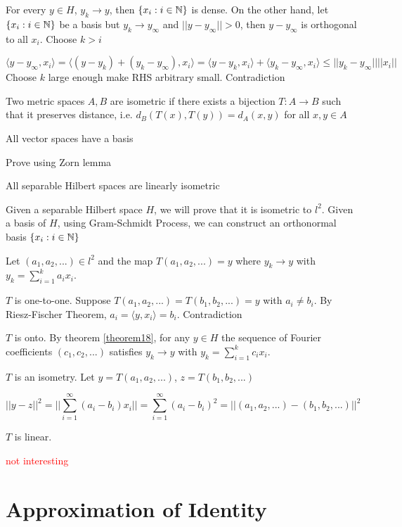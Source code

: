 \documentclass{report}
\begin{document}
For every $y \in H$, $y_k \to y$, then $\{x_i: i \in \mathbb{N} \}$ is dense. On the other hand, let $\{x_i: i \in \mathbb{N} \}$ be a basis but $y_k \to y_\infty$ and $||y - y_\infty|| > 0$, then $y - y_\infty$ is orthogonal to all $x_i$. Choose $k > i$

\[
    \langle y - y_\infty, x_i \rangle = \langle (y - y_k) + (y_k - y_\infty) , x_i \rangle = \langle y - y_k, x_i \rangle + \langle y_k - y_\infty, x_i \rangle \leq ||y_k - y_\infty|| ||x_i||
\]
Choose $k$ large enough make RHS arbitrary small. Contradiction

\begin{definition}
    Two metric spaces $A, B$ are isometric if there exists a bijection $T: A \to B$ such that it preserves distance, i.e. $d_B(T(x), T(y)) = d_A(x, y)$ for all $x, y \in A$
\end{definition}

\begin{lemma}
    All vector spaces have a basis
\end{lemma}

Prove using Zorn lemma

\begin{theorem}
    All separable Hilbert spaces are linearly isometric
\end{theorem}
Given a separable Hilbert space $H$, we will prove that it is isometric to $l^2$. Given a basis of $H$, using Gram-Schmidt Process, we can construct an orthonormal basis $\{x_i: i \in \mathbb{N} \}$

Let $(a_1, a_2, ...) \in l^2$ and the map $T(a_1, a_2, ...) = y$ where $y_k \to y$ with $y_k = \sum_{i=1}^k a_i x_i$.

$T$ is one-to-one. Suppose $T(a_1, a_2, ...) = T(b_1, b_2, ...) = y$ with $a_i \neq b_i$. By Riesz-Fischer Theorem, $a_i = \langle y, x_i \rangle = b_i$. Contradiction

$T$ is onto. By theorem \ref{theorem18}, for any $y \in H$ the sequence of Fourier coefficients $(c_1, c_2, ...)$ satisfies $y_k \to y$  with $y_k = \sum_{i=1}^k c_i x_i$.

$T$ is an isometry. Let $y = T(a_1, a_2, ...)$, $z = T(b_1, b_2, ...)$

\[
||y - z||^2 = ||\sum_{i=1}^\infty (a_i - b_i) x_i|| = \sum_{i=1}^\infty (a_i - b_i)^2 = ||(a_1, a_2, ...) - (b_1, b_2, ...)||^2
\]

$T$ is linear. 

\textcolor{red}{not interesting}

\chapter{Approximation of Identity}
\end{document}
